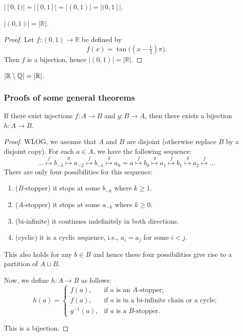 \begin{corollary}
  $|[0,1)|=|[0,1]|=|(0,1)|=|(0,1]|$.
\end{corollary}

\begin{proposition}
  $|(0,1)|=|\mathbb{R}|$.
\end{proposition}
\begin{proof}
  Let $f:(0,1)\to\mathbb{R}$ be defined by
  \[
  f(x) = \tan\bigl((x-\tfrac{1}{2})\pi\bigr).
  \]
  Then $f$ is a bijection, hence $|(0,1)|=|\mathbb{R}|$.
\end{proof}

\begin{corollary}
  $|\mathbb{R}\setminus\mathbb{Q}|=|\mathbb{R}|$.
\end{corollary}






\subsubsection{Proofs of some general theorems}

\begin{theorem}
If there exist injections \(f: A \to B\) and \(g: B \to A\), then there exists a bijection \(h: A \to B\).
\end{theorem}
\begin{proof}
WLOG, we assume that $A$ and $B$ are disjoint (otherwise replace $B$ by a disjoint copy). For each $a\in A$, we have the following sequence:
\[\ldots\overset{f}{\mapsto} b_{-3}\overset{g}{\mapsto} a_{-2}\overset{f}{\mapsto} b_{-1}\overset{g}{\mapsto} a_0=a\overset{f}{\mapsto} b_0\overset{g}{\mapsto} a_1\overset{f}{\mapsto} b_1\overset{g}{\mapsto} a_2\overset{f}{\mapsto} \ldots\]
There are only four possibilities for this sequence:
\begin{enumerate}
  \item ($B$-stopper) it stops at some $b_{-k}$ where $k\geq 1$. 
  \item ($A$-stopper) it stops at some $a_{-k}$ where $k\geq 0$.
  \item (bi-infinite) it continues indefinitely in both directions.
  \item (cyclic) it is a cyclic sequence, i.e., $a_i=a_j$ for some $i<j$.
\end{enumerate}

This also holds for any $b\in B$ and hence these four possibilities give rise to a partition of $A\sqcup B$.

Now, we define $h:A\to B$ as follows:
\[
h(a) =
\begin{cases}
f(a), & \text{if $a$ is an $A$-stopper};\\
f(a), & \text{if $a$ is in a bi-infinite chain or a cycle};\\
g^{-1}(a), & \text{if $a$ is a $B$-stopper}.
\end{cases}
\]

This is a bijection.
\end{proof}


